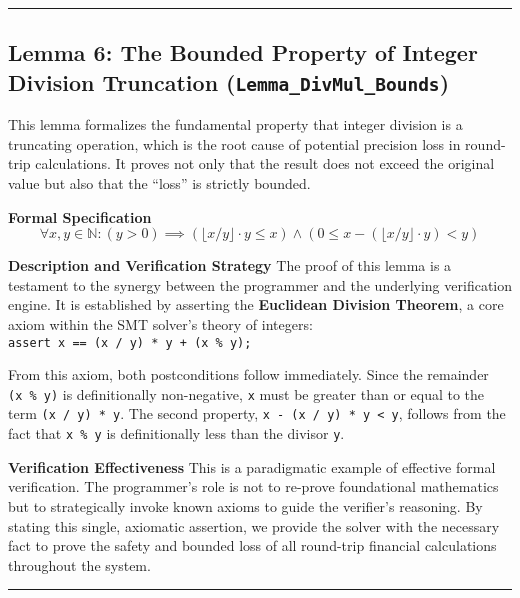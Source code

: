 \documentclass[
  english,
  onecolumn]{article}
\begin{document}
\begin{center}\rule{0.5\linewidth}{0.5pt}\end{center}

\subsection{\texorpdfstring{\textbf{Lemma 6: The Bounded Property of
Integer Division Truncation
(\texttt{Lemma\_DivMul\_Bounds})}}{Lemma 6: The Bounded Property of Integer Division Truncation (Lemma\_DivMul\_Bounds)}}\label{lemma-6-the-bounded-property-of-integer-division-truncation-lemma_divmul_bounds}

This lemma formalizes the fundamental property that integer division is
a truncating operation, which is the root cause of potential precision
loss in round-trip calculations. It proves not only that the result does
not exceed the original value but also that the ``loss'' is strictly
bounded.

\textbf{Formal Specification} \[
\forall x, y \in \mathbb{N} : (y > 0) \implies (\lfloor x/y \rfloor \cdot y \le x) \land (0 \le x - (\lfloor x/y \rfloor \cdot y) < y)
\]

\textbf{Description and Verification Strategy} The proof of this lemma
is a testament to the synergy between the programmer and the underlying
verification engine. It is established by asserting the
\textbf{Euclidean Division Theorem}, a core axiom within the SMT
solver's theory of integers:
\texttt{assert\ x\ ==\ (x\ /\ y)\ *\ y\ +\ (x\ \%\ y);}

From this axiom, both postconditions follow immediately. Since the
remainder \texttt{(x\ \%\ y)} is definitionally non-negative, \texttt{x}
must be greater than or equal to the term \texttt{(x\ /\ y)\ *\ y}. The
second property, \texttt{x\ -\ (x\ /\ y)\ *\ y\ \textless{}\ y}, follows
from the fact that \texttt{x\ \%\ y} is definitionally less than the
divisor \texttt{y}.

\textbf{Verification Effectiveness} This is a paradigmatic example of
effective formal verification. The programmer's role is not to re-prove
foundational mathematics but to strategically invoke known axioms to
guide the verifier's reasoning. By stating this single, axiomatic
assertion, we provide the solver with the necessary fact to prove the
safety and bounded loss of all round-trip financial calculations
throughout the system.

\begin{center}\rule{0.5\linewidth}{0.5pt}\end{center}
\end{document}
